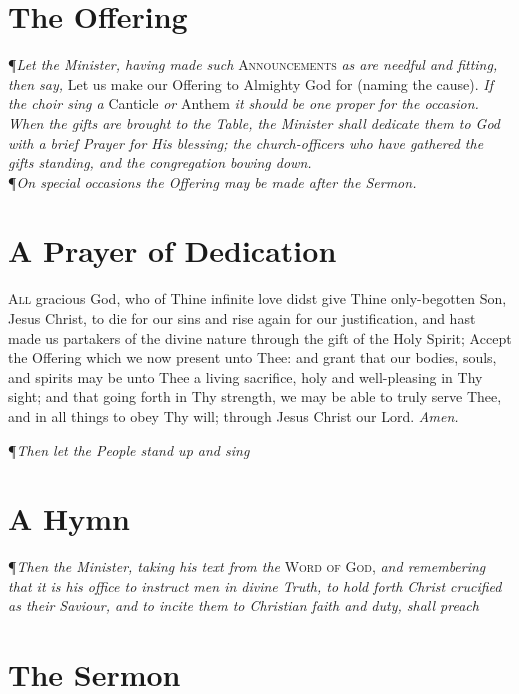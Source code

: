 \section*{The Offering}

\P \textit{Let the Minister, having made such} \textsc{Announcements} \textit{as are needful and fitting, then say,} Let us make our Offering to Almighty God for (naming the cause).
\textit{If the choir sing a} Canticle \textit{or} Anthem \textit{it should be one proper for the occasion. When the gifts are brought to the Table, the Minister shall dedicate them to God with a brief Prayer for His blessing; the church-officers who have gathered the gifts standing, and the congregation bowing down.} \\

\noindent\P \textit{On special occasions the Offering may be made after the Sermon.}

\section*{A Prayer of Dedication}

\lettrine{A}{ll} gracious God, who of Thine infinite love didst give Thine only-begotten Son, Jesus Christ, to die for our sins and rise again for our justification, and hast made us partakers of the divine nature through the gift of the Holy Spirit; Accept the Offering which we now present unto Thee: and grant that our bodies, souls, and spirits may be unto Thee a living sacrifice, holy and well-pleasing in Thy sight; and that going forth in Thy strength, we may be able to truly serve Thee, and in all things to obey Thy will; through Jesus Christ our Lord. \textit{Amen.} \\

{\centering\P \textit{Then let the People stand up and sing }\par}

\section*{A Hymn}

\P \textit{Then the Minister, taking his text from the} \textsc{Word of God,} \textit{and remembering that it is his office to instruct men in divine Truth, to hold forth Christ crucified as their Saviour, and to incite them to Christian faith and duty, shall preach}

\section*{The Sermon}


